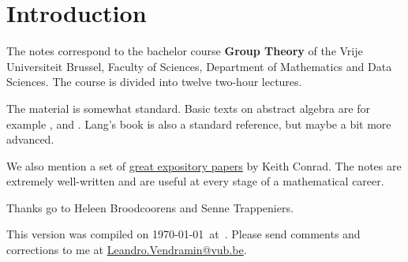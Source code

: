 \thispagestyle{plain}
\section*{Introduction}

The notes correspond to the bachelor 
course \textbf{Group Theory} of the 
Vrije Universiteit Brussel, 
Faculty of Sciences, 
Department of Mathematics and Data Sciences. The course
is divided into twelve two-hour lectures. 



The material is somewhat standard. Basic texts on abstract algebra
are for example \cite{MR1129886}, \cite{MR2286236} and \cite{MR600654}. 
Lang's book \cite{MR783636} is also a standard reference, but 
maybe a bit more advanced. 

We also mention a set of 
\href{https://kconrad.math.uconn.edu/blurbs/}{great expository papers} by Keith Conrad. 
The notes are extremely well-written and are useful at  
every stage of a mathematical career. 


 Thanks go to Heleen Broodcoorens and 
 Senne Trappeniers. 

This version 
was compiled on \today~at~\currenttime. 
Please send comments and corrections to me at \url{Leandro.Vendramin@vub.be}. 


